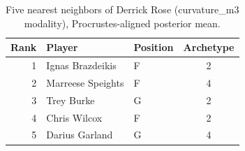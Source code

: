 \begin{table}[htbp]
  \centering\small
  \begin{tabular}{rllc}
    \toprule
    Rank & Player & Position & Archetype \\
    \midrule
    1 & Ignas Brazdeikis & F & 2 \\
    2 & Marreese Speights & F & 4 \\
    3 & Trey Burke & G & 2 \\
    4 & Chris Wilcox & F & 2 \\
    5 & Darius Garland & G & 4 \\
    \bottomrule
  \end{tabular}
  \caption{Five nearest neighbors of Derrick Rose (curvature_m3 modality), Procrustes-aligned posterior mean.}
  \label{tab:Derrick_Rose_neighbors_curvature_m3}
\end{table}

